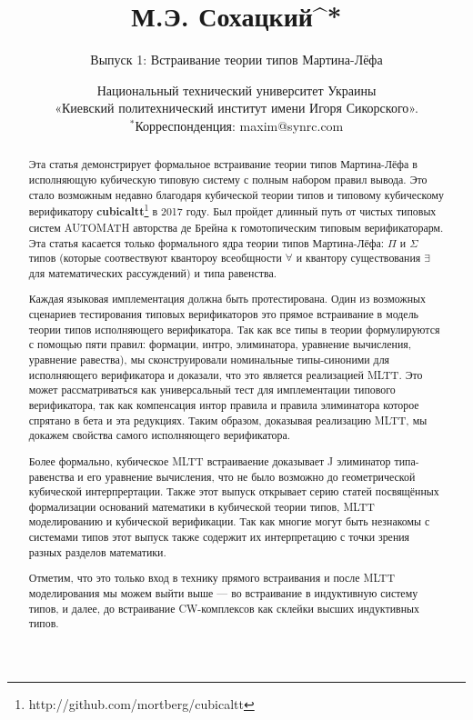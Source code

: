 \documentclass{article}
\theoremstyle{definition}
\begin{document}
\title{\small М.Э. Сохацкий^{*}}
\author{Выпуск 1: Встраивание теории типов Мартина-Лёфа}
\date{ \small Национальный технический университет Украины \\
      «Киевский политехнический институт имени Игоря Сикорского».\\
       \small $^*$Корреспонденция: maxim@synrc.com}

\maketitle

\begin{abstract}

\justifying

Эта статья демонстрирует формальное встраивание теории типов Мартина-Лёфа
в исполняющую кубическую типовую систему с полным набором правил вывода.
Это стало возможным недавно благодаря кубической теории типов и типовому кубическому
верификатору {\bf cubicaltt}\footnote{http://github.com/mortberg/cubicaltt} в 2017 году.
Был пройдет длинный путь от чистых типовых систем AUTOMATH авторства де Брейна к
гомотопическим типовым верификаторарм. Эта статья касается только формального ядра
теории типов Мартина-Лёфа: $\Pi$ и $\Sigma$ типов (которые соотвествуют
квантороу всеобщности $\forall$ и квантору существования $\exists$ для математических рассуждений)
и типа равенства.

Каждая языковая имплементация должна быть протестирована. Один из возможных
сценариев тестирования типовых верификаторов это прямое встраивание в модель
теории типов исполняющего верификатора. Так как все типы в теории формулируются
с помощью пяти правил: формации, интро, элиминатора, уравнение вычисления, уравнение равества),
мы сконструировали номинальные типы-синоними для исполняющего верификатора и доказали,
что это является реализацией MLTT. Это может рассматриваться как универсальный
тест для имплементации типового верификатора, так как компенсация интор правила и правила элиминатора
которое спрятано в бета и эта редукциях. Таким образом, доказывая реализацию MLTT,
мы докажем свойства самого исполняющего верификатора.

Более формально, кубическое MLTT встраиваение доказывает J элиминатор
типа-равенства и его уравнение вычисления, что не было возможно до
геометрической кубической интерпрертации. Также этот выпуск открывает
серию статей посвящённых формализации оснований математики в кубической теории типов,
MLTT моделированию и кубической верификации. Так как многие могут быть незнакомы
с системами типов этот выпуск также содержит их интерпретацию с точки
зрения разных разделов математики.

Отметим, что это только вход в технику прямого встраивания и после MLTT
моделирования мы можем выйти выше — во встраивание в индуктивную систему типов,
и далее, до встраивание CW-комплексов как склейки высших индуктивных типов.

\end{abstract}
\end{document}
